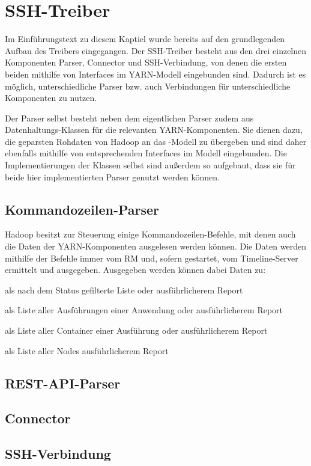 \section{SSH-Treiber}\label{sec:sshDriver}

Im Einführungstext zu diesem Kaptiel wurde bereits auf den grundlegenden Aufbau des Treibers eingegangen. Der SSH-Treiber besteht aus den drei einzelnen Komponenten Parser, Connector und SSH-Verbindung, von denen die ersten beiden mithilfe von Interfaces im YARN-Modell eingebunden sind. Dadurch ist es möglich, unterschiedliche Parser bzw. auch Verbindungen für unterschiedliche Komponenten zu nutzen.

Der Parser selbst besteht neben dem eigentlichen Parser zudem aus Datenhaltungs-Klassen für die relevanten YARN-Komponenten. Sie dienen dazu, die geparsten Rohdaten von Hadoop an das \sS-Modell zu übergeben und sind daher ebenfalls mithilfe von entsprechenden Interfaces im Modell eingebunden. Die Implementierungen der Klassen selbst sind außerdem so aufgebaut, dass sie für beide hier implementierten Parser genutzt werden können.

\subsection{Kommandozeilen-Parser}\label{sec:cmdParser}

Hadoop besitzt zur Steuerung einige Kommandozeilen-Befehle, mit denen \uA auch die Daten der YARN-Komponenten ausgelesen werden können. Die Daten werden mithilfe der Befehle immer vom \ac{RM} und, sofern gestartet, vom Timeline-Server ermittelt und ausgegeben. Ausgegeben werden können \uA dabei Daten zu:

\begin{description}[noitemsep]
    \item[Anwendungen] als nach dem Status gefilterte Liste oder ausführlicherem Report
    \item[Ausführungen] als Liste aller Ausführungen einer Anwendung oder ausführlicherem Report
    \item[Container] als Liste aller Container einer Ausführung oder ausführlicherem Report
    \item[Nodes] als Liste aller Nodes ausführlicherem Report
\end{description}


\subsection{REST-API-Parser}\label{sec:restParser}


\subsection{Connector}\label{sec:Connector}


\subsection{SSH-Verbindung}\label{sec:sshConnection}

